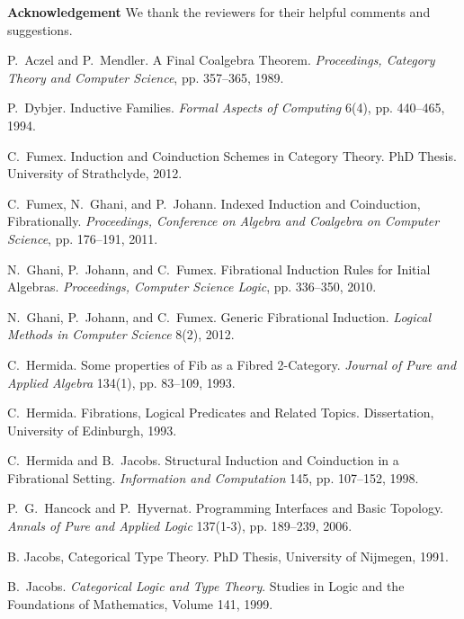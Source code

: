 \documentclass{LMCS}
\theoremstyle{plain}
\theoremstyle{remark}
\theoremstyle{definition}
\begin{document}
\vspace*{0.1in}

\noindent
{\bf Acknowledgement} We thank the reviewers for their helpful
comments and suggestions.


\begin{thebibliography}{99999}

 P.\ Aczel and P.\ Mendler. A Final Coalgebra
  Theorem. {\em Proceedings, Category Theory and
    Computer Science}, pp. 357--365, 1989.

P.\ Dybjer. Inductive Families.
{\em Formal Aspects of Computing} 6(4), pp. 440--465, 1994.

 C.\ Fumex. Induction and Coinduction Schemes in
  Category Theory. PhD Thesis. University of Strathclyde, 2012.

 C.\ Fumex, N.\ Ghani, and P.\ Johann. Indexed
  Induction and Coinduction, Fibrationally.  {\em Proceedings,
    Conference on Algebra and Coalgebra on Computer Science},
    pp. 176--191, 2011.

 N.\ Ghani, P.\ Johann, and C.\ Fumex.
Fibrational Induction Rules for Initial Algebras. {\em Proceedings,
  Computer Science Logic}, pp. 336--350, 2010. 

 N.\ Ghani, P.\ Johann, and C.\ Fumex. Generic
  Fibrational Induction. {\em Logical Methods in Computer
    Science} 8(2), 2012. 

C.\ Hermida.  Some properties of Fib as a Fibred 2-Category.  {\em
  Journal of Pure and Applied Algebra} 134(1), pp. 83--109, 1993. 

C.\ Hermida. Fibrations, Logical Predicates and Related
Topics. Dissertation, University of Edinburgh, 1993.

C.\ Hermida and B.\ Jacobs. Structural Induction and Coinduction in a
Fibrational Setting. {\em Information and Computation} 145,
pp. 107--152, 1998.  

 P.\ G.\ Hancock and P.\ Hyvernat. Programming
  Interfaces and Basic Topology.  {\em Annals of Pure and Applied
    Logic} 137(1-3), pp. 189--239, 2006.

B. Jacobs, Categorical Type Theory. PhD Thesis, University of
Nijmegen, 1991.  

B.\ Jacobs. \emph{Categorical Logic and Type Theory}. Studies in Logic
and the Foundations of Mathematics, Volume 141, 1999. 


\end{thebibliography}
\end{document}
